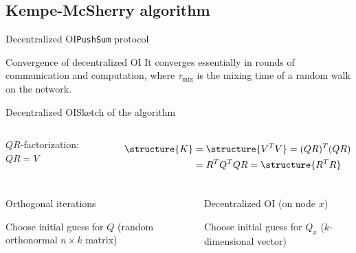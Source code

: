 \documentclass[xcolor=table,final]{beamer} %
\newcommand{\PushSum}{\texttt{PushSum}\xspace}
\begin{document}
\subsection{Kempe-McSherry algorithm}
\begin{frame}{Decentralized OI}{\PushSum protocol}
  \begin{block}{Convergence of decentralized OI}
    It converges essentially in
    rounds of communication and computation, 
    where $\tau_{\text{mix}}$ is the mixing  time  of  a  random  walk  on  the  network. 
  \end{block}
\end{frame}
\begin{frame}{Decentralized OI}{Sketch of the algorithm}
  \begin{columns}
    $QR$-factorization: $QR = V$

    \begin{align*}
      \structure{K}& = \structure{V^TV} = (QR)^T(QR) \\ &= R^TQ^TQR = \structure{R^T R}
    \end{align*}
  \end{columns}

  \begin{columns}
    \begin{block}{Orthogonal iterations}
      \begin{algorithm}[H]
        \BlankLine

        Choose initial guess for $Q$ {\small (random orthonormal $n \times k$ matrix)} \;

      \end{algorithm}
    \end{block}
    \begin{block}{Decentralized OI  (on node $x$)}
      \begin{algorithm}[H]
        \BlankLine

        Choose initial guess for $Q_x$ ($k$-dimensional vector) \;

      \end{algorithm}
    \end{block}
  \end{columns}
\end{frame}
\end{document}
